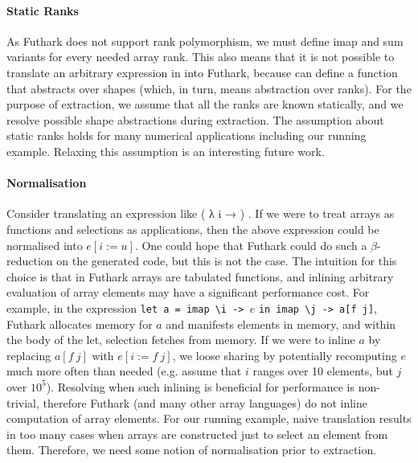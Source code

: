 \paragraph{Static Ranks} As Futhark does not support rank polymorphism, we must define imap and sum variants for every needed array rank. This also means that
it is not possible to translate an arbitrary expression in  into
Futhark, because  can define a function that abstracts over shapes
(which, in turn, means abstraction over ranks).  For the purpose of
extraction, we assume that all the ranks are known statically, and we
resolve possible shape abstractions during extraction.  The assumption about
static ranks holds for many numerical applications including our
running example.  Relaxing this assumption is an interesting future work.

\paragraph{Normalisation} Consider translating an expression like
 ( λ i → ) .  If we were to treat arrays
as functions and selections as applications, then the above expression
could be normalised into $e[i := u]$.  One could hope that Futhark could do
such a $\beta$-reduction on the generated code, but this is not the case.
The intuition for this choice is that in Futhark arrays are tabulated
functions, and inlining arbitrary evaluation of array elements may
have a significant performance cost.  For example, in the expression
\texttt{let a = imap \textbackslash i -> }$e$ \texttt{in imap \textbackslash j -> a[f j]}, Futhark
allocates memory for $a$ and manifests elements in memory, and within the
body of the let, selection fetches from memory.  If we were
to inline $a$ by replacing $a[f\ j]$ with $e[i := f\ j]$, we loose sharing
by potentially recomputing $e$ much more often than needed
(e.g. assume that $i$ ranges over 10 elements, but $j$ over $10^5$).
Resolving when such inlining is beneficial for performance is non-trivial,
therefore Futhark (and many other array languages) do not inline 
computation of array elements.  For our running example, naive translation
results in too many cases when arrays are constructed just to select
an element from them.  Therefore, we need some notion of normalisation
prior to extraction.


